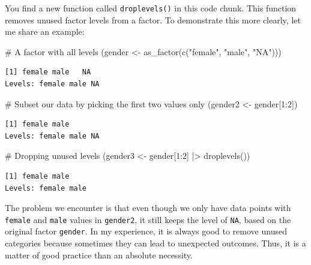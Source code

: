 \documentclass[
  letterpaper,
]{krantz}
\makeatletter
\newenvironment{Shaded}{\begin{snugshade}}{\end{snugshade}}
\newcommand{\CommentTok}[1]{\textcolor[rgb]{0.37,0.37,0.37}{#1}}
\newcommand{\DecValTok}[1]{\textcolor[rgb]{0.68,0.00,0.00}{#1}}
\newcommand{\FunctionTok}[1]{\textcolor[rgb]{0.28,0.35,0.67}{#1}}
\newcommand{\NormalTok}[1]{\textcolor[rgb]{0.00,0.23,0.31}{#1}}
\newcommand{\OtherTok}[1]{\textcolor[rgb]{0.00,0.23,0.31}{#1}}
\newcommand{\SpecialCharTok}[1]{\textcolor[rgb]{0.37,0.37,0.37}{#1}}
\newcommand{\StringTok}[1]{\textcolor[rgb]{0.13,0.47,0.30}{#1}}
\newenvironment{kframe}{%
\medskip{}
\setlength{\fboxsep}{.8em}
 \def\at@end@of@kframe{}%
 \ifinner\ifhmode%
  \def\at@end@of@kframe{\end{minipage}}%
  \begin{minipage}{\columnwidth}%
 \fi\fi%
 \def\FrameCommand##1{\hskip\@totalleftmargin \hskip-\fboxsep
 \colorbox{shadecolor}{##1}\hskip-\fboxsep
     \hskip-\linewidth \hskip-\@totalleftmargin \hskip\columnwidth}%
 \MakeFramed {\advance\hsize-\width
   \@totalleftmargin\z@ \linewidth\hsize
   \@setminipage}}%
 {\par\unskip\endMakeFramed%
 \at@end@of@kframe}
\renewenvironment{Shaded}{\begin{kframe}}{\end{kframe}}
\makeatother
\begin{document}
You find a new function called \texttt{droplevels()} in this code chunk.
This function removes unused factor levels from a factor. To demonstrate
this more clearly, let me share an example:

\begin{Shaded}
\begin{Highlighting}[]
\CommentTok{\# A factor with all levels}
\NormalTok{(gender }\OtherTok{\textless{}{-}} \FunctionTok{as\_factor}\NormalTok{(}\FunctionTok{c}\NormalTok{(}\StringTok{"female"}\NormalTok{, }\StringTok{"male"}\NormalTok{, }\StringTok{"NA"}\NormalTok{)))}
\end{Highlighting}
\end{Shaded}

\begin{verbatim}
[1] female male   NA    
Levels: female male NA
\end{verbatim}

\begin{Shaded}
\begin{Highlighting}[]
\CommentTok{\# Subset our data by picking the first two values only}
\NormalTok{(gender2 }\OtherTok{\textless{}{-}}\NormalTok{ gender[}\DecValTok{1}\SpecialCharTok{:}\DecValTok{2}\NormalTok{])}
\end{Highlighting}
\end{Shaded}

\begin{verbatim}
[1] female male  
Levels: female male NA
\end{verbatim}

\begin{Shaded}
\begin{Highlighting}[]
\CommentTok{\# Dropping unused levels}
\NormalTok{(gender3 }\OtherTok{\textless{}{-}}\NormalTok{ gender[}\DecValTok{1}\SpecialCharTok{:}\DecValTok{2}\NormalTok{] }\SpecialCharTok{|\textgreater{}} \FunctionTok{droplevels}\NormalTok{())}
\end{Highlighting}
\end{Shaded}

\begin{verbatim}
[1] female male  
Levels: female male
\end{verbatim}

The problem we encounter is that even though we only have data points
with \texttt{female} and \texttt{male} values in \texttt{gender2}, it
still keeps the level of \texttt{NA}, based on the original factor
\texttt{gender}. In my experience, it is always good to remove unused
categories because sometimes they can lead to unexpected outcomes. Thus,
it is a matter of good practice than an absolute necessity.
\end{document}
